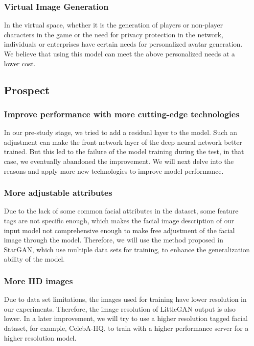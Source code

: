 \subsubsection*{Virtual Image Generation}
In the virtual space, whether it is the generation of players or non-player characters in the game or the need for privacy protection in the network, individuals or enterprises have certain needs for personalized avatar generation.
We believe that using this model can meet the above personalized needs at a lower cost.

\subsection{Prospect}
\subsubsection*{Improve performance with more cutting-edge technologies}

In our pre-study stage, we tried to add a residual layer to the model.
Such an adjustment can make the front network layer of the deep neural network better trained.
But this led to the failure of the model training during the test, in that case, we eventually abandoned the improvement.
We will next delve into the reasons and apply more new technologies to improve model performance.


\subsubsection*{More adjustable attributes}

Due to the lack of some common facial attributes in the dataset, some feature tags are not specific enough, which makes the facial image description of our input model not comprehensive enough to make free adjustment of the facial image through the model.
Therefore, we will use the method proposed in StarGAN, which use multiple data sets for training, to enhance the generalization ability of the model.


\subsubsection*{More HD images}
Due to data set limitations, the images used for training have lower resolution in our experiments.
Therefore, the image resolution of LittleGAN output is also lower.
In a later improvement, we will try to use a higher resolution tagged facial dataset, for example, CelebA-HQ, to train with a higher performance server for a higher resolution model.
